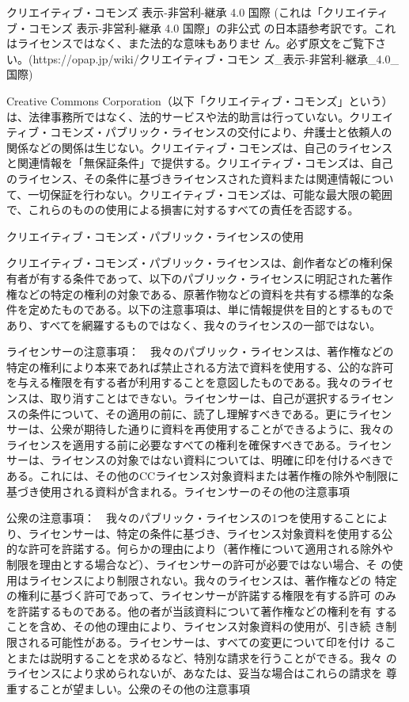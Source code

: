 {\tiny
\setlength{\baselineskip}{0truept}
\setlength{\parsep}{0truept}
\setlength{\parskip}{5truept}

クリエイティブ・コモンズ 表示-非営利-継承 4.0 国際
(これは「クリエイティブ・コモンズ 表示-非営利-継承 4.0 国際」の非公式
の日本語参考訳です。これはライセンスではなく、また法的な意味もありませ
ん。必ず原文をご覧下さい。(https://opap.jp/wiki/クリエイティブ・コモン
ズ\_表示-非営利-継承\_4.0\_国際)
~\newline

Creative Commons Corporation（以下「クリエイティブ・コモンズ」という）
は、法律事務所ではなく、法的サービスや法的助言は行っていない。クリエイ
ティブ・コモンズ・パブリック・ライセンスの交付により、弁護士と依頼人の
関係などの関係は生じない。クリエイティブ・コモンズは、自己のライセンス
と関連情報を「無保証条件」で提供する。クリエイティブ・コモンズは、自己
のライセンス、その条件に基づきライセンスされた資料または関連情報につい
て、一切保証を行わない。クリエイティブ・コモンズは、可能な最大限の範囲
で、これらのものの使用による損害に対するすべての責任を否認する。

クリエイティブ・コモンズ・パブリック・ライセンスの使用

クリエイティブ・コモンズ・パブリック・ライセンスは、創作者などの権利保
有者が有する条件であって、以下のパブリック・ライセンスに明記された著作
権などの特定の権利の対象である、原著作物などの資料を共有する標準的な条
件を定めたものである。以下の注意事項は、単に情報提供を目的とするもので
あり、すべてを網羅するものではなく、我々のライセンスの一部ではない。


ライセンサーの注意事項：　我々のパブリック・ライセンスは、著作権などの
特定の権利により本来であれば禁止される方法で資料を使用する、公的な許可
を与える権限を有する者が利用することを意図したものである。我々のライセ
ンスは、取り消すことはできない。ライセンサーは、自己が選択するライセン
スの条件について、その適用の前に、読了し理解すべきである。更にライセン
サーは、公衆が期待した通りに資料を再使用することができるように、我々の
ライセンスを適用する前に必要なすべての権利を確保すべきである。ライセン
サーは、ライセンスの対象ではない資料については、明確に印を付けるべきで
ある。これには、その他のCCライセンス対象資料または著作権の除外や制限に
基づき使用される資料が含まれる。ライセンサーのその他の注意事項


公衆の注意事項：　我々のパブリック・ライセンスの1つを使用することによ
り、ライセンサーは、特定の条件に基づき、ライセンス対象資料を使用する公
的な許可を許諾する。何らかの理由により（著作権について適用される除外や
  制限を理由とする場合など）、ライセンサーの許可が必要ではない場合、そ
の使用はライセンスにより制限されない。我々のライセンスは、著作権などの
特定の権利に基づく許可であって、ライセンサーが許諾する権限を有する許可
のみを許諾するものである。他の者が当該資料について著作権などの権利を有
することを含め、その他の理由により、ライセンス対象資料の使用が、引き続
き制限される可能性がある。ライセンサーは、すべての変更について印を付け
ることまたは説明することを求めるなど、特別な請求を行うことができる。我々
のライセンスにより求められないが、あなたは、妥当な場合はこれらの請求を
尊重することが望ましい。公衆のその他の注意事項

}
